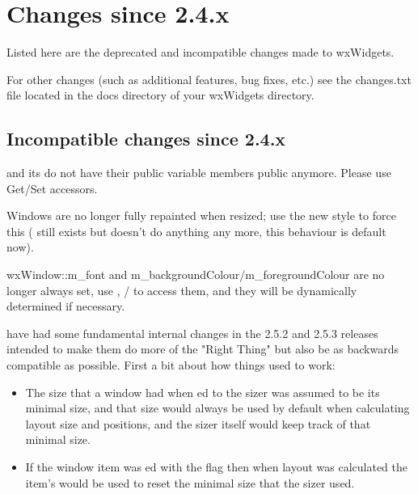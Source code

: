 \section{Changes since 2.4.x}\label{changes}

Listed here are the deprecated and incompatible changes made to wxWidgets.

For other changes (such as additional features, bug fixes, etc.) see the changes.txt file located in the docs directory of your wxWidgets directory.

\subsection{Incompatible changes since 2.4.x}\label{incompatiblesince24}


 and its  do not have their public variable members public anymore.
Please use Get/Set accessors.


Windows are no longer fully repainted when resized; use the new style  to force this ( still exists but doesn't do anything any more, this behaviour is default now).


wxWindow::m\_font and m\_backgroundColour/m\_foregroundColour are no longer always set, use , / to access them, and they will be dynamically determined if necessary.


 have had some fundamental internal changes in the 2.5.2 and 2.5.3 releases intended to make them do more of the "Right Thing" but also be as backwards compatible as possible.  First a bit about how things used to work:

\begin{itemize}\itemsep=0pt
\item The size that a window had when ed to the sizer was assumed
      to be its minimal size, and that size would always be used by
      default when calculating layout size and positions, and the
      sizer itself would keep track of that minimal size.

\item If the window item was ed with the  flag
      then when layout was calculated the item's  would be
      used to reset the minimal size that the sizer used.
\end{itemize}

